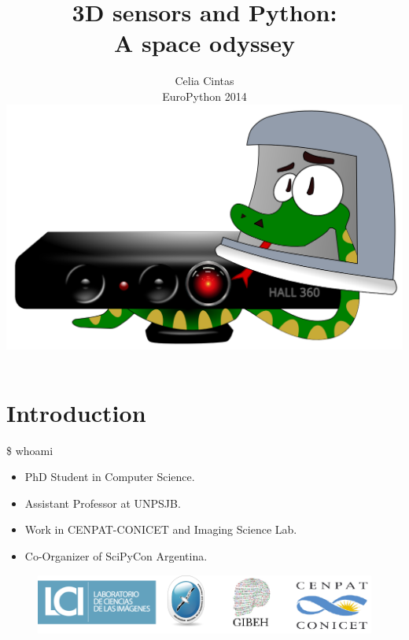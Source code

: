 \documentclass[bigger]{beamer}
\begin{document}
\title{3D sensors and Python:\\ A space odyssey \\[0.5cm]}
\subtitle{Celia Cintas \\[0.2cm] EuroPython 2014 \\[0.3cm]
\includegraphics[scale=0.2]{Imagenes/hall360.png}}
\date{}
\begin{frame}
\titlepage
\end{frame}
\section{Introduction}
\begin{frame}{\$ whoami}
\begin{itemize}
    \item PhD Student in Computer Science.
    \item Assistant Professor at UNPSJB.
    \item Work in CENPAT-CONICET and Imaging Science Lab.
    \item Co-Organizer of SciPyCon Argentina.
\end{itemize}
\begin{figure}
        \includegraphics[scale = 0.25]{Imagenes/uni.png}
\end{figure}
\end{frame}
\end{document}
